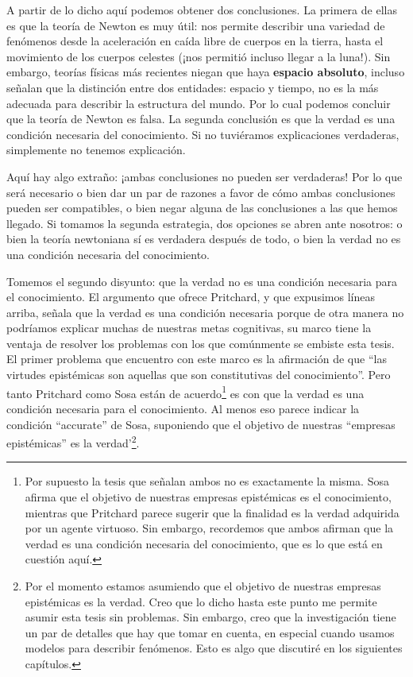 \documentclass{article}
\begin{document}
A partir de lo dicho aquí podemos obtener dos conclusiones. La primera de ellas es que la teoría de Newton es muy útil: nos permite describir una variedad de fenómenos desde la aceleración en caída libre de cuerpos en la tierra, hasta el movimiento de los cuerpos celestes (¡nos permitió incluso llegar a la luna!). Sin embargo, teorías físicas más recientes niegan que haya \textbf{espacio absoluto}, incluso señalan que la distinción entre dos entidades: espacio y tiempo, no es la más adecuada para describir la estructura del mundo. Por lo cual podemos concluir que la teoría de Newton es falsa. La segunda conclusión es que la verdad es una condición necesaria del conocimiento. Si no tuviéramos explicaciones verdaderas, simplemente no tenemos explicación.

Aquí hay algo extraño: ¡ambas conclusiones no pueden ser verdaderas! Por lo que será necesario o bien dar un par de razones a favor de cómo ambas conclusiones pueden ser compatibles, o bien negar alguna de las conclusiones a las que hemos llegado. Si tomamos la segunda estrategia, dos opciones se abren ante nosotros: o bien la teoría newtoniana sí es verdadera después de todo, o bien la verdad no es una condición necesaria del conocimiento.

Tomemos el segundo disyunto: que la verdad no es una condición necesaria para el conocimiento. El argumento que ofrece Pritchard, y que expusimos líneas arriba, señala que la verdad es una condición necesaria porque de otra manera no podríamos explicar muchas de nuestras metas cognitivas, su marco tiene la ventaja de resolver los problemas con los que comúnmente se embiste esta tesis. El primer problema que encuentro con este marco es la afirmación de que ``las virtudes epistémicas son aquellas que son constitutivas del conocimiento''. Pero tanto Pritchard como Sosa están de acuerdo\footnote{Por supuesto la tesis que señalan ambos no es exactamente la misma. Sosa afirma que el objetivo de nuestras empresas epistémicas es el conocimiento, mientras que Pritchard parece sugerir que la finalidad es la verdad adquirida por un agente virtuoso. Sin embargo, recordemos que ambos afirman que la verdad es una condición necesaria del conocimiento, que es lo que está en cuestión aquí.} es con que la verdad es una condición necesaria para el conocimiento. Al menos eso parece indicar la condición ``accurate'' de Sosa, suponiendo que el objetivo de nuestras ``empresas epistémicas'' es la verdad'\footnote{Por el momento estamos asumiendo que el objetivo de nuestras empresas epistémicas es la verdad. Creo que lo dicho hasta este punto me permite asumir esta tesis sin problemas. Sin embargo, creo que la investigación tiene un par de detalles que hay que tomar en cuenta, en especial cuando usamos modelos para describir fenómenos. Esto es algo que discutiré en los siguientes capítulos.}. 
\end{document}
